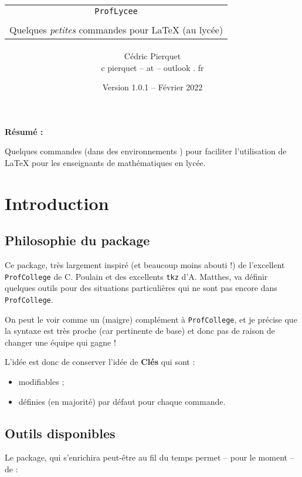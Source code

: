 \documentclass{article}
\title{%
\begin{minipage}{0.75\linewidth}
	\begin{tcolorbox}[colframe=yellow,colback=yellow!15]
		\begin{center}
			\begin{tabular}{c}
				\lstinline!ProfLycee!\\
				\\
				Quelques \textit{petites} commandes pour  \LaTeX{} (au lycée)
			\end{tabular}
		\end{center}
	\end{tcolorbox}
\end{minipage}
}
\author{
	\begin{tabular}{c}
		Cédric Pierquet\\
		{\ttfamily c pierquet -- at -- outlook . fr}
	\end{tabular}
}
\date{Version 1.0.1 -- Février 2022}
\newcommand\Cle[1]{{\bfseries\sffamily\textlangle #1\textrangle}}
\begin{document}
\thispagestyle{empty}

\maketitle

{\Large \bfseries Résumé : }

\medskip

\noindent Quelques commandes (dans des environnements \TikZ) pour faciliter l'utilisation
	de \LaTeX{} pour les enseignants de mathématiques en lycée.\\

\bigskip

\tableofcontents

\newpage

\section{Introduction}

\subsection{\og Philosophie \fg{} du package}

Ce \textsf{package}, très largement inspiré (et beaucoup moins abouti !) de l'excellent \lstinline!ProfCollege! de C. Poulain et des excellents \lstinline!tkz! d'A. Matthes, va définir quelques outils pour des situations particulières qui ne sont pas encore dans \lstinline!ProfCollege!.

On peut le voir comme un (maigre) complément à \lstinline!ProfCollege!, et je précise que la syntaxe est très proche (car pertinente de base) et donc pas de raison de changer une équipe qui gagne !

\medskip

L'idée est donc de conserver l'idée de \Cle{Clés} qui sont :
%
\begin{itemize}
	\item modifiables ;
	\item définies (en majorité) par défaut pour chaque commande.
\end{itemize}

\subsection{Outils disponibles}

Le \textsf{package}, qui s'enrichira peut-être au fil du temps permet -- pour le moment -- de :
\end{document}
